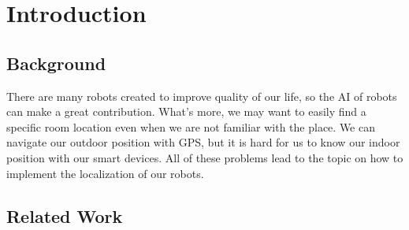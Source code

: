 \section{Introduction}
\label{sec:introduction}
\subsection{Background}
	There are many robots created to improve quality of our life, so the AI of robots can make a great contribution. What's more, we may want to easily find a specific room location even when we are not familiar with the place. We can navigate our outdoor position with GPS, but it is hard for us to know our indoor position with our smart devices. All of these problems lead to the topic on how to implement the localization of our robots.

\subsection{Related Work}



